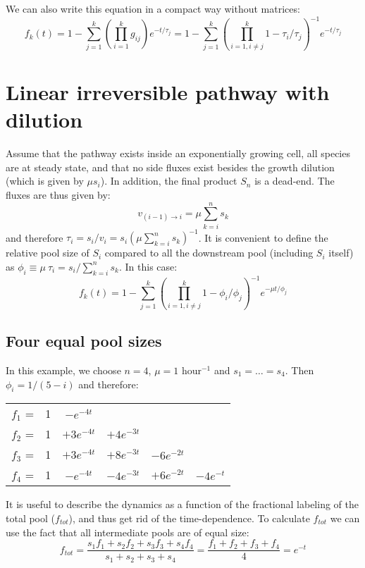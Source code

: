 \documentclass{article}
\begin{document}
We can also write this equation in a compact way without matrices:
\begin{equation}
    f_k(t) = 
    1 - \sum_{j=1}^{k} \left(\prod_{i=1}^{k} g_{ij}\right) e^{- t/\tau_j} = 
    1 - \sum_{j=1}^{k} \left(\prod_{i = 1, i \neq j}^{k} 1 - \tau_i/\tau_j\right)^{-1} e^{- t/\tau_j}
\end{equation}

\section{Linear irreversible pathway with dilution}\label{sec:linear_examples}
Assume that the pathway exists inside an exponentially growing cell, all species are at steady state, and that no side fluxes exist besides the growth dilution (which is given by $\mu s_i$). In addition, the final product $S_n$ is a dead-end. The fluxes are thus given by:
\begin{equation}
    v_{(i-1) \rightarrow i} = \mu \sum_{k=i}^n s_k
\end{equation}
and therefore $\tau_i = s_i/v_i = s_i (\mu \sum_{k=i}^n s_k)^{-1}$. It is convenient to define the relative pool size of $S_i$ compared to all the downstream pool (including $S_i$ itself) as $\phi_i \equiv \mu~\tau_i = s_i / \sum_{k=i}^n s_k$. In this case:
\begin{equation}\label{eq:dilution}
    f_k(t) = 1 - \sum_{j=1}^{k} \left(\prod_{i = 1, i \neq j}^{k} 1 - \phi_i/\phi_j\right)^{-1} e^{- \mu t / \phi_j}
\end{equation}

\subsection{Four equal pool sizes}
In this example, we choose $n = 4$, $\mu = 1$ hour$^{-1}$ and $s_1 = \ldots = s_4$. Then $\phi_i = 1/(5-i)$ and therefore:
\begin{center}
\begin{tabular}{cccccc}
    $f_1$ = & 1 & $- e^{-4t}$ \\
    $f_2$ = & 1 & $+ 3 e^{-4t}$ & $+ 4 e^{-3t}$ \\
    $f_3$ = & 1 & $+ 3 e^{-4t}$ & $+ 8 e^{-3t}$ & $- 6 e^{-2t}$ \\
    $f_4$ = & 1 & $- e^{-4t}$   & $- 4 e^{-3t}$ & $+ 6 e^{-2t}$ & $- 4 e^{-t}$
\end{tabular}
\end{center}

It is useful to describe the dynamics as a function of the fractional labeling of the total pool ($f_{tot}$), and thus get rid of the time-dependence. To calculate $f_{tot}$ we can use the fact that all intermediate pools are of equal size:
\begin{equation}
    f_{tot} = \frac{s_1 f_1 + s_2 f_2 + s_3 f_3 + s_4 f_4}{s_1 + s_2 + s_3 + s_4} = \frac{f_1 + f_2 + f_3 + f_4}{4} = e^{-t}
\end{equation}
\end{document}
